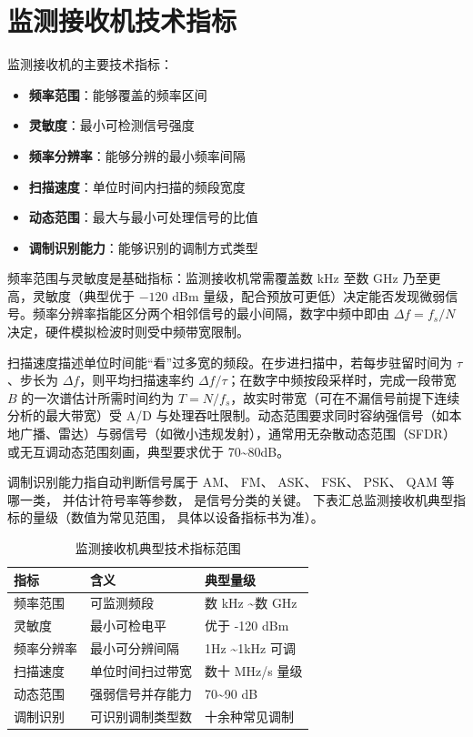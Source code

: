 \section{监测接收机技术指标}
\label{sec:monitoring_specifications}

监测接收机的主要技术指标：

\begin{itemize}
    \item \textbf{频率范围}：能够覆盖的频率区间
    \item \textbf{灵敏度}：最小可检测信号强度
    \item \textbf{频率分辨率}：能够分辨的最小频率间隔
    \item \textbf{扫描速度}：单位时间内扫描的频段宽度
    \item \textbf{动态范围}：最大与最小可处理信号的比值
    \item \textbf{调制识别能力}：能够识别的调制方式类型
\end{itemize}

频率范围与灵敏度是基础指标：监测接收机常需覆盖数 kHz 至数 GHz 乃至更高，灵敏度（典型优于 $-120$ dBm 量级，配合预放可更低）决定能否发现微弱信号。频率分辨率指能区分两个相邻信号的最小间隔，数字中频中即由 $\Delta f=f_s/N$ 决定，硬件模拟检波时则受中频带宽限制。

扫描速度描述单位时间能“看”过多宽的频段。在步进扫描中，若每步驻留时间为 $\tau$、步长为 $\Delta f$，则平均扫描速率约 $\Delta f/\tau$；在数字中频按段采样时，完成一段带宽 $B$ 的一次谱估计所需时间约为 $T=N/f_s$，故实时带宽（可在不漏信号前提下连续分析的最大带宽）受 A/D 与处理吞吐限制。动态范围要求同时容纳强信号（如本地广播、雷达）与弱信号（如微小违规发射），通常用无杂散动态范围（SFDR）或无互调动态范围刻画，典型要求优于 70\sim80dB。

调制识别能力指自动判断信号属于 AM、
FM、
ASK、
FSK、
PSK、
QAM 等哪一类，
并估计符号率等参数，
是信号分类的关键。
下表汇总监测接收机典型指标的量级（数值为常见范围，
具体以设备指标书为准）。

\begin{table}[htbp]
\centering
\caption{监测接收机典型技术指标范围}
\begin{tabular}{|p{4.4cm}|p{5.6cm}|p{5.0cm}|}
\hline
\textbf{指标} & \textbf{含义} & \textbf{典型量级} \\
\hline
频率范围 & 可监测频段 & 数 kHz \sim 数 GHz \\
\hline
灵敏度 & 最小可检电平 & 优于 -120 dBm \\
\hline
频率分辨率 & 最小可分辨间隔 & 1Hz \sim 1kHz 可调 \\
\hline
扫描速度 & 单位时间扫过带宽 & 数十 MHz/s 量级 \\
\hline
动态范围 & 强弱信号并存能力 & 70\sim90 dB \\
\hline
调制识别 & 可识别调制类型数 & 十余种常见调制 \\
\hline
\end{tabular}
\end{table}

